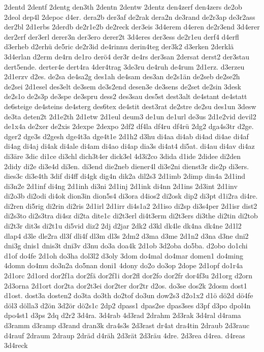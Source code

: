 {2dentd
2dentf
2dentg
den3th
2dentn
2dentw
2dentz
den4zerf
den4zers
de2ob
2deol
dep4l
2depoc
d4er.
dera2b
der3af
de2rak
dera2n
de3rand
de2r3ap
de3r2ass
der2bl
2d1erbs
2derdb
de2r1e2b
de2reck
der3eis
3d4erem
d4eren
de2r3end
3d4erer
der2erf
der3erl
derer3n
der3ero
derer2t
3d4eres
der3ess
de2r1eu
derf4
d4erfl
d3erheb
d2erhü
de5ric
de2r3id
de4rinnu
derin4teg
der3k2
d3erken
2derklä
3d4erlan
d2erm
de4rn
de1ro
derö4
der3r
de4rs
der3san
2dersat
derst2
der3stau
dert5ende.
derter4e
dert4ra
4der4trag
3de3ru
de4ruh
de4rum
2d1erz.
d3erzeu
2d1erzv
d2es.
de2sa
de4sa2g
des1ah
de4sam
des3an
de2s1än
de2seb
de2se2h
de2sei
2d1esel
des3elt
de3sem
de3s2end
desen3e
de3sens
de2set
de2sin
3desk
de2s1o
de2s3p
de3spe
de3spru
dess2
des3sau
des5st
dest3alt
de4stant
de4statt
de6steige
de4steins
de4sterg
des6tex
de4stit
dest3rat
de2stre
de2su
des1un
3desw
de3ta
deten2t
2d1e2th
2d1etw
2d1eul
deum3
de1un
de1url
de3us
2d1e2vid
devil2
de1x4a
de2xer
de2xis
2dexpe
2dexpo
2df2
df4la
df4ru
df4rü
2dg2
dga4s3tr
d2ge.
dger2
dge3s
d2gesh
dge4t3a
dge4t1e
2d1h2
d3hu
di4aa
di4ab
di4ad
di4ae
di4af
di4ag
di4aj
di4ak
di4ale
di4am
di4ao
di4ap
dia3s
di4at4
di5at.
di4au
di4av
di4az
di3äre
3dic
di1ce
di3chl
dich3t4er
dick3el
4d3i2co
3dida
d1ide
2didee
di2den
2didy
di2e
di3e4d
di3en.
di3end
die2neb
diener4l
di3e2ni
dienst3r
die2p
di3ers.
dies3c
di3e4th
3dif
di4ff
di4gk
dig4n
dik2a
dil2s3
2d1imb
2dimp
din4a
2d1ind
di3n2e
2d1inf
di4ng
2d1inh
di3ni
2d1inj
2d1ink
di4nn
2d1ins
2d3int
2d1inv
di2o3b
di2odi
di4ok
dion3in
dion5s4
di3ora
d4ios2
di2osk
dip2
di3pt
d1i2ra
di4re.
di2ren
di5rig
di2rin
di2ris
2d1irl
2d1irr
di4s1a2
2d1iso
di2sp
di3s4per
2d1isr
dist2
di2s3to
di2s3tra
di4sz
di2ta
dite1c
di2t3erl
di4t3erm
di2t3ers
di3the
di2tin
di2tob
di2t3r
dit3s
di2t1u
di5vid
diz2
2dj
d2jar
2dk2
d3kl
dk4le
dk4na
dk4ne
2d1l2
dlap4
d3le
dle2ra
dl3f
dli4f
dl3m
dl3s
2dm2
d3ma
d3me
2d1n2
d3na
d3ne
dni2
dni3g
dnis1
dnis3t
dni3v
d3nu
do3a
doa4k
2d1ob
3d2oba
do5ba.
d2obo
do1chi
d1of
do4fe
2d1oh
do3ha
dol3l2
d3oly
3dom
do4mal
do4mar
domen1
do4ming
4domn
do4mu
do3n2a
do5nan
doni1
4dony
do2o
do3op
2dope
2d1opf
do1r4a
2d1orc
2d1ord
dor2f1a
dor2fä
dor2f1i
dor2fl
dor2fo
dor2fr
dor4f3u
2d1org
d2orn
2d3orna
2d1ort
dor2ta
dor2t3ei
dor2ter
dor2tr
d2os.
do3se
dos2k
2dosm
dost1
d1ost.
dost3a
dosten2
do3ta
do3th
do2tof
do3un
dow2s3
d2o1x2
d1ö
dö2d
dö4fe
döl3
dölla3
d2ön
3d2ör
dö2s1c
2dp2
dpass1
dpas2se
dpas3ses
d3pf
d3po
dpol4n
dpo4st1
d3ps
2dq
d2r2
3d4ra.
3d4rab
4d3rad
2drahm
2d3rak
3d4ral
d4rama
d3ramm
d3ramp
d3rand
dran3k
dra4s3s
2d3rast
dr4at
dra4tin
2draub
2d3rauc
d4rauf
2draum
2draup
2dräd
d4räh
2d3rät
2d3räu
4dre.
2d3rea
d4rea.
d4reas
3d4reck
}
